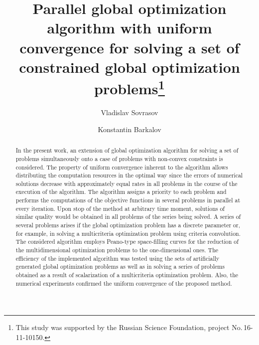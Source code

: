 \documentclass[runningheads]{llncs}
\begin{document}
%
\title{Parallel global optimization algorithm with uniform convergence
for solving a set of constrained global optimization problems\thanks{This study was supported
by the Russian Science Foundation, project No.\,16-11-10150.}}
%
%
\author{Vladislav Sovrasov\and
Konstantin Barkalov
}
%
%
%
\maketitle              %
%
\begin{abstract}
In the present work, an extension of global optimization algorithm for solving a set of problems
simultaneously onto a case of problems with non-convex constraints is considered. The property
of uniform convergence inherent to the algorithm allows distributing the computation resources
in the optimal way since the errors of numerical solutions decrease with approximately equal
rates in all problems in the course of the execution of the algorithm. The algorithm assigns a
priority to each problem and performs the computations of the objective functions in several
problems in parallel at every iteration. Upon stop of the method at arbitrary time moment,
solutions of similar quality would be obtained in all problems of the series being solved. A series
of several problems arises if the global optimization problem has a discrete parameter or, for
example, in solving a multicriteria optimization problem using criteria convolution. The
considered algorithm employs Peano-type space-filling curves for the reduction of the
multidimensional optimization problems to the one-dimensional ones.  The efficiency of the
implemented algorithm was tested using the sets of artificially generated global optimization
problems as well as in solving a series of problems obtained as a result of scalarization of a
multicriteria optimization  problem. Also, the numerical experiments confirmed the uniform
convergence of the proposed method.

\end{abstract}
%
%
%
\end{document}
